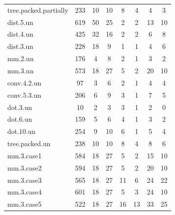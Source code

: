 \begin{table}
\begin{tabular}{lccccccc}
    tree.packed.partially & 233 & 10 & 10 & 8 & 4 & 4 & 3\\
    dist.5.un & 619 & 50 & 25 & 2 & 2 & 13 & 10\\
    dist.4.un & 425 & 32 & 16 & 2 & 2 & 6 & 8\\
    dist.3.un & 228 & 18 & 9 & 1 & 1 & 4 & 6\\
    mm.2.un & 176 & 4 & 8 & 2 & 1 & 3 & 2\\
    mm.3.un & 573 & 18 & 27 & 5 & 2 & 20 & 10\\
    conv.4.2.un & 97 & 3 & 6 & 2 & 1 & 4 & 4\\
    conv.5.3.un & 206 & 6 & 9 & 3 & 1 & 7 & 5\\
    dot.3.un & 10 & 2 & 3 & 3 & 1 & 2 & 0\\
    dot.6.un & 159 & 5 & 6 & 4 & 1 & 3 & 2\\
    dot.10.un & 254 & 9 & 10 & 6 & 1 & 5 & 4\\
    tree.packed.un & 238 & 10 & 10 & 8 & 4 & 8 & 6\\
    mm.3.case1 & 584 & 18 & 27 & 5 & 2 & 15 & 10\\
    mm.3.case2 & 594 & 18 & 27 & 5 & 2 & 20 & 10\\
    mm.3.case3 & 565 & 18 & 27 & 11 & 6 & 24 & 22\\
    mm.3.case4 & 601 & 18 & 27 & 5 & 3 & 24 & 10\\
    mm.3.case5 & 522 & 18 & 27 & 16 & 13 & 33 & 25\\\bottomrule
    \end{tabular}
    \end{table}
    

